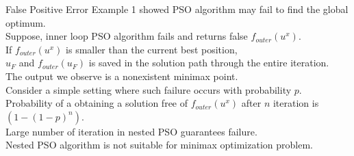 \documentclass{beamer}
\begin{document}
\begin{frame}{False Positive Error}
  Example 1 showed PSO algorithm may fail to find the global optimum.\\
  \vspace{3mm}
  Suppose, inner loop PSO algorithm fails and returns false $f_{outer}(u^x)$.\\
  \vspace{3mm}
  If $f_{outer}(u^x)$ is smaller than the current best position,\\
  $u_F$ and $f_{outer}(u_F)$ is saved in the solution path through the entire iteration.\\
  \vspace{3mm}
  The output we observe is a nonexistent minimax point.\\
  \vspace{3mm}
  Consider a simple setting where such failure occurs with probability $p$.\\
  Probability of a obtaining a solution free of $f_{outer}(u^x)$ after $n$ iteration is $\left(1-(1-p)^n\right)$.\\
  \vspace{3mm}
  Large number of iteration in nested PSO guarantees failure.\\
  \vspace{3mm}
  Nested PSO algorithm is not suitable for minimax optimization problem.
\end{frame}
\end{document}
